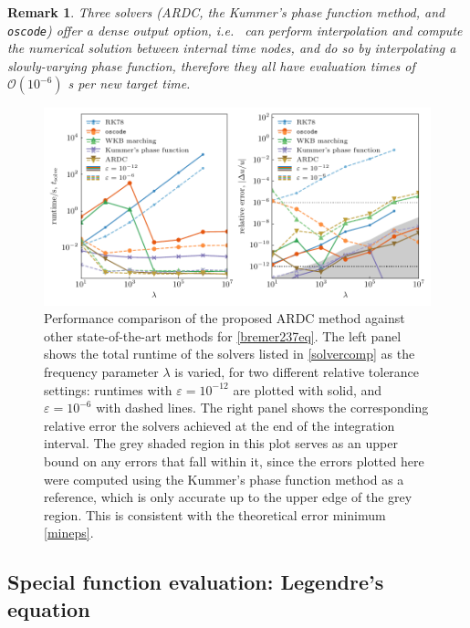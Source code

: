 \documentclass[10pt]{article}
\newcommand{\ie}{{\it i.e.\ }}
\newtheorem{rmk}[thm]{Remark}
\begin{document}
\begin{rmk}
Three solvers (ARDC, the
Kummer's phase function method, and \texttt{oscode}) offer a dense output option, \ie
can perform interpolation and compute the numerical solution between
internal time nodes, and do so by interpolating a slowly-varying phase function,
therefore they all have evaluation times of
$\mathcal{O}(10^{-6})$ \si{\s} per new target time.  
\end{rmk}

\begin{figure}[tb]
    \centering
    \includegraphics{plots/bremer237-timing-1thread.pdf}
    \caption{\label{bremer237-timing} Performance comparison of the proposed ARDC method against
    other state-of-the-art methods for \cref{bremer237eq}. The left panel
    shows the total runtime of the solvers listed in \cref{solvercomp} as the
    frequency parameter $\lambda$ is varied, for two different relative
    tolerance settings: runtimes with $\varepsilon = 10^{-12}$ are plotted with
    solid, and $\varepsilon = 10^{-6}$ with dashed lines. The right panel shows
    the corresponding relative error the solvers achieved at the end of the
    integration interval. The grey shaded region in this plot serves as an
    upper bound on any errors that fall within it, since the errors plotted
    here were computed using the Kummer's phase function method as a reference, which is
    only accurate up to the upper edge of the grey region. This is consistent with the theoretical error minimum \eqref{mineps}.}
\end{figure}




\subsection{Special function evaluation: Legendre's equation}
\end{document}
